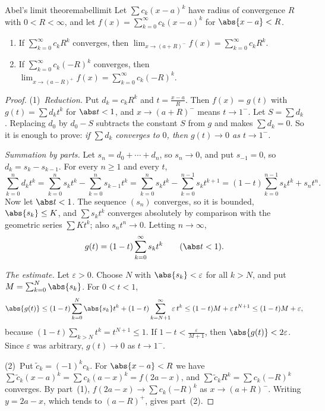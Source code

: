 \documentclass[11pt]{article}
\begin{document}
\begin{thm}{Abel's limit theorem}{abellimit}
Let $\sum c_k(x-a)^k$ have radius of convergence $R$ with $0<R<\infty$, and let $f(x)=\sum_{k=0}^\infty c_k(x-a)^k$ for $\abs{x-a}<R$.
\begin{enumerate}
  \item If $\sum_{k=0}^\infty c_kR^k$ converges, then $\displaystyle\lim_{x\to(a+R)^-}f(x)=\sum_{k=0}^\infty c_kR^k$.
  \item If $\sum_{k=0}^\infty c_k(-R)^k$ converges, then $\displaystyle\lim_{x\to(a-R)^+}f(x)=\sum_{k=0}^\infty c_k(-R)^k$.
\end{enumerate}
\end{thm}
\begin{proof}
(1)~\emph{Reduction.} Put $d_k=c_kR^k$ and $t=\frac{x-a}R$. Then $f(x)=g(t)$ with $g(t)=\sum d_kt^k$ for $\abs t<1$, and $x\to(a+R)^-$ means $t\to1^-$. Let $S=\sum d_k$. Replacing $d_0$ by $d_0-S$ subtracts the constant $S$ from $g$ and makes $\sum d_k=0$. So it is enough to prove: \emph{if $\sum d_k$ converges to $0$, then $g(t)\to0$ as $t\to1^-$.}

\emph{Summation by parts.} Let $s_n=d_0+\cdots+d_n$, so $s_n\to0$, and put $s_{-1}=0$, so $d_k=s_k-s_{k-1}$. For every $n\ge1$ and every $t$,
\[
\sum_{k=0}^nd_kt^k=\sum_{k=0}^ns_kt^k-\sum_{k=0}^ns_{k-1}t^k=\sum_{k=0}^ns_kt^k-\sum_{k=0}^{n-1}s_kt^{k+1}=(1-t)\sum_{k=0}^{n-1}s_kt^k+s_nt^n .
\]
Now let $\abs t<1$. The sequence $(s_n)$ converges, so it is bounded, $\abs{s_k}\le K$, and $\sum s_kt^k$ converges absolutely by comparison with the geometric series $\sum Kt^k$; also $s_nt^n\to0$. Letting $n\to\infty$,
\[
g(t)=(1-t)\sum_{k=0}^\infty s_kt^k\qquad(\abs t<1).
\]

\emph{The estimate.} Let $\varepsilon>0$. Choose $N$ with $\abs{s_k}<\varepsilon$ for all $k>N$, and put $M=\sum_{k=0}^N\abs{s_k}$. For $0<t<1$,
\[
\abs{g(t)}\le(1-t)\sum_{k=0}^N\abs{s_k}t^k+(1-t)\sum_{k=N+1}^\infty\varepsilon\,t^k\le(1-t)M+\varepsilon\,t^{N+1}\le(1-t)M+\varepsilon ,
\]
because $(1-t)\sum_{k>N}t^k=t^{N+1}\le1$. If $1-t<\frac\varepsilon{M+1}$, then $\abs{g(t)}<2\varepsilon$. Since $\varepsilon$ was arbitrary, $g(t)\to0$ as $t\to1^-$.

(2)~Put $\tilde c_k=(-1)^kc_k$. For $\abs{x-a}<R$ we have $\sum\tilde c_k(x-a)^k=\sum c_k(a-x)^k=f(2a-x)$, and $\sum\tilde c_kR^k=\sum c_k(-R)^k$ converges. By part~(1), $f(2a-x)\to\sum c_k(-R)^k$ as $x\to(a+R)^-$. Writing $y=2a-x$, which tends to $(a-R)^+$, gives part~(2).
\end{proof}
\end{document}
